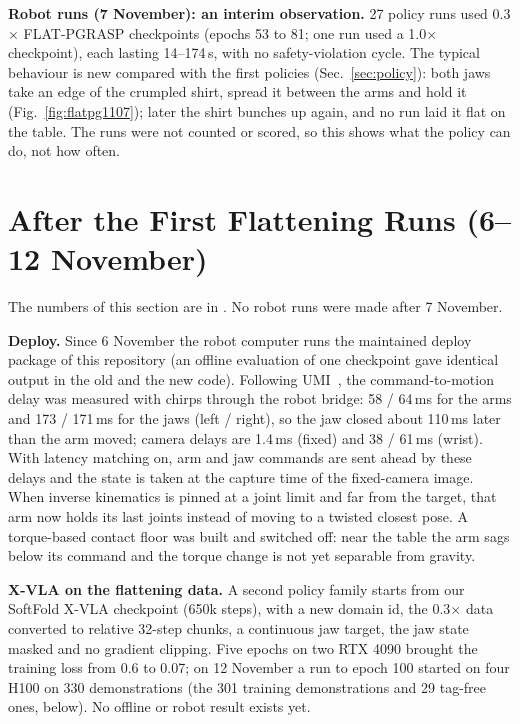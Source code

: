 \documentclass[conference,10pt]{IEEEtran}
\begin{document}
\textbf{Robot runs (7 November): an interim observation.} 27 policy runs used 0.3$\times$ FLAT-PGRASP checkpoints
(epochs 53 to 81; one run used a 1.0$\times$ checkpoint), each lasting 14--174\,s, with no safety-violation cycle. The
typical behaviour is new compared with the first policies (Sec.~\ref{sec:policy}): both jaws take an edge of the crumpled
shirt, spread it between the arms and hold it (Fig.~\ref{fig:flatpg1107}); later the shirt bunches up again, and no run
laid it flat on the table. The runs were not counted or scored, so this shows what the policy can do, not how often.

\section{After the First Flattening Runs (6--12 November)}\label{sec:after}
The numbers of this section are in . No robot runs were made after 7 November.

\textbf{Deploy.} Since 6 November the robot computer runs the maintained deploy package of this repository (an offline
evaluation of one checkpoint gave identical output in the old and the new code). Following UMI~\cite{chi2024umi}, the
command-to-motion delay was measured with chirps through the robot bridge: 58 / 64\,ms for the arms and 173 / 171\,ms for
the jaws (left / right), so the jaw closed about 110\,ms later than the arm moved; camera delays are 1.4\,ms (fixed) and
38 / 61\,ms (wrist). With latency matching on, arm and jaw commands are sent ahead by these delays and the state is taken
at the capture time of the fixed-camera image. When inverse kinematics is pinned at a joint limit and far from the
target, that arm now holds its last joints instead of moving to a twisted closest pose. A torque-based contact floor was
built and switched off: near the table the arm sags below its command and the torque change is not yet separable from
gravity.

\textbf{X-VLA on the flattening data.} A second policy family starts from our SoftFold X-VLA checkpoint (650k steps), with a
new domain id, the 0.3$\times$ data converted to relative 32-step chunks, a continuous jaw target, the jaw state masked and
no gradient clipping. Five epochs on two RTX 4090 brought the training loss from 0.6 to 0.07; on 12 November a run to
epoch 100 started on four H100 on 330 demonstrations (the 301 training demonstrations and 29 tag-free ones, below). No
offline or robot result exists yet.
\end{document}
